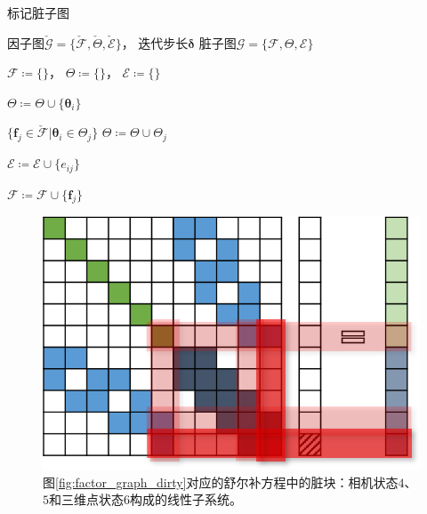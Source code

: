 \begin{algorithm}
\caption{标记脏子图}
\begin{algorithmic}
    \Require 因子图$\check{\mathcal{G}}=\{\check{\mathcal{F}},\check{\Theta},\check{\mathcal{E}}\}$，
             迭代步长$\bm{\delta}$
    \Ensure 脏子图$\mathcal{G}=\{\mathcal{F},\Theta,\mathcal{E}\}$

    \State $\mathcal{F}\coloneqq\{\}$，
           $\Theta\coloneqq\{\}$，
           $\mathcal{E}\coloneqq\{\}$

        \State $\Theta\coloneqq\Theta\cup\{\bm{\theta}_i\}$

        \ForAll
        {$\{
                \bm{f}_j\in\check{\mathcal{F}} |
                \bm{\theta}_i\in\Theta_j
        \}$}
            \State $\Theta\coloneqq\Theta\cup\Theta_j$

            \State $\mathcal{E} \coloneqq \mathcal{E} \cup \{e_{ij}\}$

            \State $\mathcal{F} \coloneqq \mathcal{F} \cup \{\bm{f}_j\}$
        \EndFor
    \EndFor
\end{algorithmic}
\label{alg:mark_dirty}
\end{algorithm}

\begin{figure}[htb!]
    \centering
    \includegraphics{figs/normal_eq_dirty.png}
    \caption{图\ref{fig:factor_graph_dirty}对应的舒尔补方程中的脏块：相机状态$4$、$5$和三维点状态$6$构成的线性子系统。}
    \label{fig:normal_eq_dirty}
\end{figure}

